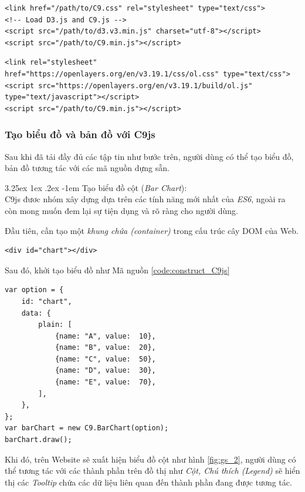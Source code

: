 \documentclass[12pt,a4paper]{article}
\makeatletter
\newcommand{\myparagraph}[1]{\paragraph{#1}\mbox{}\\} %
\renewcommand\paragraph{\@startsection{paragraph}{5}{\z@}%
  {3.25ex \@plus1ex \@minus.2ex}%
  {-1em}%
  {\normalfont\normalsize\bfseries}}
\makeatother
\begin{document}
\begin{lstlisting}[caption=Tải mã nguồn \textit{D3.js} trước tiên]
<link href="/path/to/C9.css" rel="stylesheet" type="text/css">
<!-- Load D3.js and C9.js -->
<script src="/path/to/d3.v3.min.js" charset="utf-8"></script>
<script src="/path/to/C9.min.js"></script>
\end{lstlisting}

\begin{lstlisting}[caption=Tải mã nguồn \textit{OpenLayers 3} nếu muốn sử dụng chức năng Bản đồ]
<link rel="stylesheet" href="https://openlayers.org/en/v3.19.1/css/ol.css" type="text/css">
<script src="https://openlayers.org/en/v3.19.1/build/ol.js" type="text/javascript"></script>
<script src="/path/to/C9.min.js"></script>
\end{lstlisting}

\subsubsection{Tạo biểu đồ và bản đồ với C9js}
Sau khi đã tải đầy đủ các tập tin như bước trên, người dùng có thể tạo biểu đồ, bản đồ tương tác với các mã nguồn dựng sẵn.

\myparagraph{Tạo biểu đồ cột (\textit{Bar Chart}):}
C9js đươc nhóm xây dựng dựa trên các tính năng mới nhất của \textit{ES6}, ngoài ra còn mong muốn đem lại sự tiện dụng và rõ ràng cho người dùng.

Đầu tiên, cần tạo một \textit{khung chứa (container)} trong cấu trúc cây DOM của Web.

\begin{lstlisting}[caption=Tạo \textit{container} để chứa biểu đồ]
<div id="chart"></div>
\end{lstlisting}

Sau đó, khởi tạo biểu đồ như Mã nguồn \ref{code:construct_C9js}

\begin{lstlisting}[caption=Khởi tạo biểu đồ với C9js,label={code:construct_C9js}]
var option = {
    id: "chart",
    data: {
        plain: [
            {name: "A", value:  10},
            {name: "B", value:  20},
            {name: "C", value:  50},
            {name: "D", value:  30},
            {name: "E", value:  70},
        ],
    }, 
};
var barChart = new C9.BarChart(option);
barChart.draw();
\end{lstlisting}

Khi đó, trên Website sẽ xuất hiện biểu đồ cột như hình \ref{fig:gs_2}, người dùng có thể tương tác với các thành phần trên đồ thị như \textit{Cột, Chú thích (Legend)} sẽ hiển thị các \textit{Tooltip} chứa các dữ liệu liên quan đến thành phần đang được tương tác.
\end{document}
